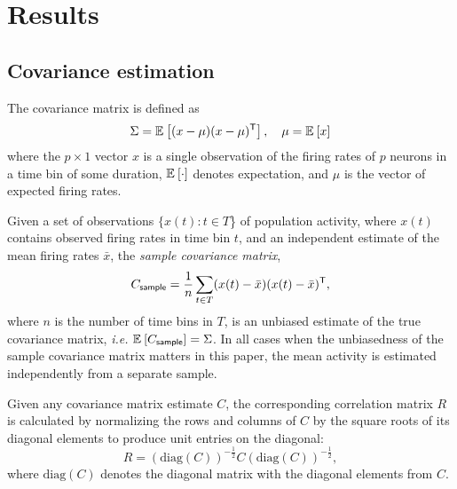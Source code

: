 \section*{Results}
\subsection*{Covariance estimation}
The covariance matrix is defined as
\begin{equation}\label{eq:true-covariance}
    \Sigma = \mathbb E_{}\left[ (x-\mu)(x-\mu)^{\sf T}\right],\quad \mu = \mathbb E_{}\left[ x\right]
    \end{equation}
    where the $p\times 1$ vector $x$ is a single observation of the firing rates of $p$ neurons in a time bin of some duration, $\mathbb E_{}\left[ \cdot\right]$ denotes expectation, and $\mu$ is the vector of expected firing rates. 

Given a set of observations $\{x(t): t\in T$\} of population activity, where $x(t)$ contains observed firing rates in time bin $t$, and an independent estimate of the mean firing rates $\bar x$, the \emph{sample covariance matrix},
\begin{equation}\label{eq:sample}
    C_{\sf sample} = \frac 1 n \sum\limits_{t\in T} (x(t)-\bar x)(x(t)-\bar x)^{\sf T},
    \end{equation}
where $n$ is the number of time bins in $T$, is an unbiased estimate of the true covariance matrix, \emph{i.e.} $\mathbb E_{}\left[ C_{\sf sample}\right]=\Sigma$. 
In all cases when the unbiasedness of the sample covariance matrix matters in this paper, the mean activity is estimated independently from a separate sample.

Given any covariance matrix estimate $C$, the corresponding correlation matrix $R$ is calculated by normalizing the rows and columns of $C$ by the square roots of its diagonal elements to produce unit entries on the diagonal:
\begin{equation}\label{eq:precision}
    R = (\mbox{diag}(C))^{-\frac 1 2} C (\mbox{diag}(C))^{-\frac 1 2},
\end{equation}
where $\mbox{diag}(C)$ denotes the diagonal matrix with the diagonal elements from $C$.

